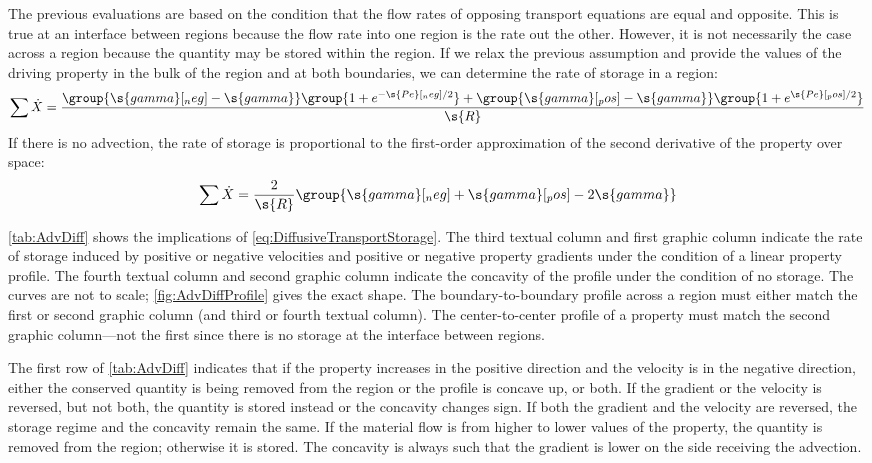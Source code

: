 The previous evaluations are based on the condition that the flow rates of opposing transport equations are equal and opposite.  This is true at an interface between regions because the flow rate into one region is the rate out the other.  However, it is not necessarily the case across a region because the quantity may be stored within the region.  If we relax the previous assumption and provide the values of the driving property in the bulk of the region and at both boundaries, we can determine the rate of storage in a region:
\begin{equation}
  \label{eq:DiffusiveTransportStorage}
  \sum\dot{X} = \frac{\group{\s{gamma}[_neg] - \s{gamma}}\group{1 + e^{-\s{Pe}[_neg]/2}} + \group{\s{gamma}[_pos] - \s{gamma}}\group{1 + e^{\s{Pe}[_pos]/2}}}{\s{R}}
\end{equation}
If there is no advection, the rate of storage is proportional to the first-order approximation of the second derivative of the property over space:
\begin{equation}
  \sum\dot{X} = \frac{2}{\s{R}}\group{\s{gamma}[_neg] + \s{gamma}[_pos] - 2\s{gamma}}
\end{equation}

\autoref{tab:AdvDiff} shows the implications of \autoref{eq:DiffusiveTransportStorage}.  The third textual column and first graphic column indicate the rate of storage induced by positive or negative velocities and positive or negative property gradients under the condition of a linear property profile.  The fourth textual column and second graphic column indicate the concavity of the profile under the condition of no storage.  The curves are not to scale; \autoref{fig:AdvDiffProfile} gives the exact shape.  The boundary-to-boundary profile across a region must either match the first or second graphic column (and third or fourth textual column).  The center-to-center profile of a property must match the second graphic column---not the first since there is no storage at the interface between regions.

The first row of \autoref{tab:AdvDiff} indicates that if the property increases in the positive direction and the velocity is in the negative direction, either the conserved quantity is being removed from the region or the profile is concave up, or both.  If the gradient or the velocity is reversed, but not both, the quantity is stored instead or the concavity changes sign.  If both the gradient and the velocity are reversed, the storage regime and the concavity remain the same.  If the material flow is from higher to lower values of the property, the quantity is removed from the region; otherwise it is stored.  The concavity is always such that the gradient is lower on the side receiving the advection.

